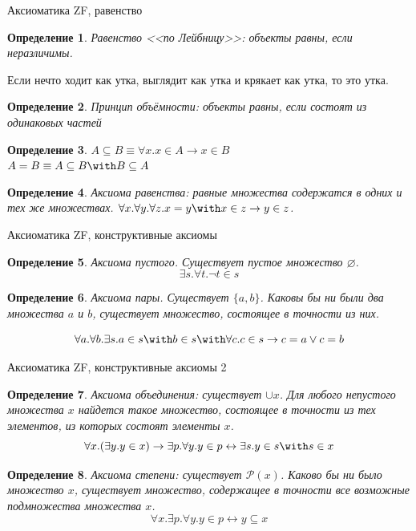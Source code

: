 \documentclass[aspectratio=169]{beamer}
\newtheorem{dfn}{Определение}[section]
\begin{document}
\begin{frame}{Аксиоматика ZF, равенство}
\begin{dfn} Равенство <<по Лейбницу>>: объекты равны, если неразличимы.\end{dfn} Если нечто ходит как утка, выглядит как 
утка и крякает как утка, то это утка.\pause
\begin{dfn} Принцип объёмности: объекты равны, если состоят из одинаковых частей\end{dfn}\pause

\begin{dfn} $A \subseteq B \equiv \forall x.x \in A \rightarrow x \in B$ \\\pause
 $A = B \equiv A \subseteq B \with B \subseteq A$ \end{dfn}\pause
\begin{dfn} Аксиома равенства: равные множества содержатся в одних и тех же множествах. 
$\forall x. \forall y. \forall z. x = y \with x \in z \rightarrow y \in z$.
\end{dfn}
\end{frame}

\begin{frame}{Аксиоматика ZF, конструктивные аксиомы}
\begin{dfn} Аксиома пустого. Существует пустое множество $\varnothing$. $$\exists s.\forall t.\neg t \in s$$ \end{dfn}\pause
\begin{dfn} Аксиома пары. Существует $\{a,b\}$.
Каковы бы ни были два множества $a$ и $b$, существует множество, состоящее 
в точности из них. 

$$\forall a.\forall b.\exists s.a \in s \with b \in s \with \forall c.c \in s \rightarrow c = a \vee c = b$$ \end{dfn}
\end{frame}

\begin{frame}{Аксиоматика ZF, конструктивные аксиомы 2}
\begin{dfn} Аксиома объединения: существует $\cup x$. 
Для любого непустого множества $x$ найдется такое множество, состоящее в точности
из тех элементов, из которых состоят элементы $x$. 
$$\forall x.(\exists y.y \in x) \rightarrow \exists p.\forall y.y \in p \leftrightarrow \exists s.y \in s \with s \in x$$
 \end{dfn}\pause
\begin{dfn} Аксиома степени: существует $\mathcal{P}(x)$.
Каково бы ни было множество $x$, существует множество, содержащее в точности
все возможные подмножества множества $x$.
$$\forall x.\exists p.\forall y.y \in p \leftrightarrow y \subseteq x$$
\end{dfn}
\end{frame}
\end{document}
